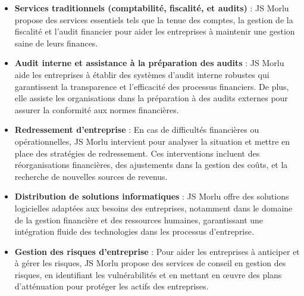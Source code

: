 \begin{itemize}
    \item \textbf{Services traditionnels (comptabilité, fiscalité, et audits)} :
JS Morlu propose des services essentiels tels que la tenue des comptes, la gestion de la fiscalité et l’audit financier pour aider les entreprises à maintenir une gestion saine de leurs finances.

\vspace{0.3cm}

\item \textbf{Audit interne et assistance à la préparation des audits} :
JS Morlu aide les entreprises à établir des systèmes d’audit interne robustes qui garantissent la transparence et l'efficacité des processus financiers. De plus, elle assiste les organisations dans la préparation à des audits externes pour assurer la conformité aux normes financières.

\vspace{0.3cm}

\item \textbf{Redressement d'entreprise} :
En cas de difficultés financières ou opérationnelles, JS Morlu intervient pour analyser la situation et mettre en place des stratégies de redressement. Ces interventions incluent des réorganisations financières, des ajustements dans la gestion des coûts, et la recherche de nouvelles sources de revenus.

\vspace{0.3cm}

\item \textbf{Distribution de solutions informatiques} :
JS Morlu offre des solutions logicielles adaptées aux besoins des entreprises, notamment dans le domaine de la gestion financière et des ressources humaines, garantissant une intégration fluide des technologies dans les processus d’entreprise.

\vspace{0.3cm}

\item \textbf{Gestion des risques d'entreprise} :
Pour aider les entreprises à anticiper et à gérer les risques, JS Morlu propose des services de conseil en gestion des risques, en identifiant les vulnérabilités et en mettant en œuvre des plans d’atténuation pour protéger les actifs des entreprises.

\end{itemize}

\vspace{0.5cm}

